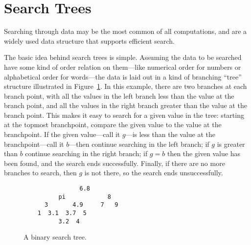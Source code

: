 \newcommand{\sharetree}{\text{ST}}
\newcommand{\rectree}{\text{RT}}
\newcommand{\ubt}{\text{UT}}
\newcommand{\Searcht}{\text{ST}}
\newcommand{\leafset}{\text{Leaves}}
\newcommand{\leafp}[1]{\text{leaf?}(#1)}
\newcommand{\rightsub}[1]{\text{right}(#1)}
\newcommand{\leftsub}[1]{\text{left}(#1)}
\newcommand{\subtr}[1]{\text{sbtrs}(#1)}
\newcommand{\psubtr}[1]{\text{propsbtrs}(#1)}


\section{Search Trees}

Searching through data may be the most common of all computations, and
 are a widely used data structure that supports
efficient search.

The basic idea behind search trees is simple.  Assuming the data to be
searched have some kind of order relation on them---like numerical order
for numbers or alphabetical order for words---the data is laid out in
a kind of branching ``tree'' structure illustrated in
Figure~\ref{searchtree1}.  In this example, there are two branches at
each branch point, with all the values in the left branch less than
the value at the branch point, and all the values in the right branch
greater than the value at the branch point.  This makes it easy to
search for a given value in the tree: starting at the topmost
branchpoint, compare the given value to the value at the branchpoint.
If the given value---call it $g$---is less than the value at the
branchpoint---call it $b$---then continue searching in the left
branch; if $g$ is greater than $b$ continue searching in the right
branch; if $g = b$ then the given value has been found, and the search
ends successfully.  Finally, if there are no more branches to search,
then $g$ is not there, so the search ends unsuccessfully.

\begin{figure}


\begin{verbatim}
                6.8
          pi            8  
      3       4.9     7   9 
    1  3.1  3.7  5
          3.2  4 
\end{verbatim}

\caption{A binary search tree.}

\label{searchtree1}

\end{figure}

